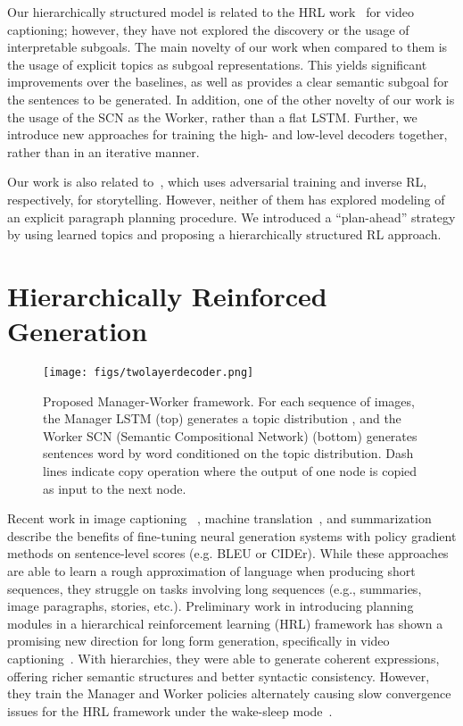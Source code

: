 \documentclass[letterpaper]{article} \usepackage{aaai19}  \usepackage{times}  \usepackage{helvet}  \usepackage{courier}  \usepackage{url}  \usepackage{graphicx}
\begin{document}
Our hierarchically structured model is related to the HRL work~\cite{wang2018video} for video captioning; however, they have not explored the discovery or the usage of interpretable subgoals. The main novelty of our work when compared to them is the usage of explicit topics as subgoal representations. This yields significant improvements over the baselines, as well as provides a clear semantic subgoal for the sentences to be generated. In addition, one of the other novelty of our work is the usage of the SCN as the Worker, rather than a flat LSTM. Further, we introduce new approaches for training the high- and low-level decoders together, rather than in an iterative manner.

Our work is also related to~\cite{wang2018show,wang2018no}, which uses adversarial training and inverse RL, respectively, for storytelling. However, neither of them has explored modeling of an explicit paragraph planning procedure. We introduced a ``plan-ahead'' strategy by using learned topics and proposing a hierarchically structured RL approach.

\section{Hierarchically Reinforced Generation} \label{sec:model_description}
\begin{figure*}[t]
	\centering
	\texttt{[image: figs/twolayerdecoder.png]}		
	\caption{\small Proposed Manager-Worker framework. For each sequence of images, the Manager LSTM (top) generates a topic distribution , and the Worker SCN (Semantic Compositional Network) (bottom) generates sentences word by word  conditioned on the topic distribution. Dash lines indicate copy operation where the output of one node is copied as input to the next node.}
	\label{fig:implementation_hrl_agent}
\end{figure*}

Recent work in image captioning ~\cite{Rennie2016Self,Pasunuru2017Reinforced}, machine translation~\cite{wu2016google}, and summarization~\cite{paulus2017deep,Celikyilmaz2018DCA} describe the benefits of fine-tuning neural generation systems with policy gradient methods on sentence-level scores (e.g. BLEU or CIDEr). 
While these approaches are able to learn a rough approximation of language when producing short sequences, they struggle on tasks involving long sequences (e.g., summaries, image paragraphs, stories, etc.). 
Preliminary work in introducing planning modules in a hierarchical reinforcement learning (HRL) framework has shown a promising new direction for long form generation, specifically in video captioning~\cite{wang2018video}. 
With hierarchies, they were able to generate coherent expressions, offering richer semantic structures and better syntactic consistency. However, they train the Manager and Worker policies
alternately causing slow convergence issues for the HRL framework under the wake-sleep mode~\cite{Neal1996}. 
\end{document}

